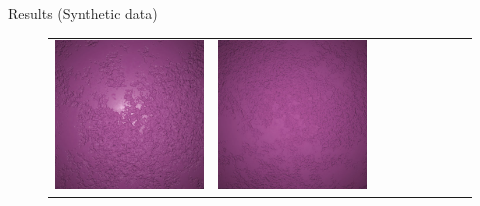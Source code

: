 \documentclass[final]{beamer}
\newlength{\twocolwid}
\newlength{\resultwidth}
\begin{document}
\begin{frame}[t]
\begin{columns}[t]
\begin{column}{\twocolwid}
\begin{block}{Results (Synthetic data)}
\begin{figure}[t]
\begin{tabular}{ccrclcccc}
            		\includegraphics[width=\resultwidth]{synth/plaster/good3.jpg} &
            		\includegraphics[width=\resultwidth]{synth/plaster/bad1.jpg}
            		\\

\end{tabular}
\end{figure}
\end{block}
\end{column}
\end{columns}
\end{frame}
\end{document}
